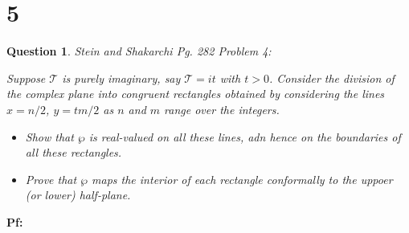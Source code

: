 \documentclass{article}
\newtheorem{question}{Question}
\begin{document}
\break

\section*{5}
\begin{myBox}[]{}
    \begin{question}
        Stein and Shakarchi Pg. 282 Problem 4:

        Suppose $\mathcal{T}$ is purely imaginary, say $\mathcal{T}=it$ with $t>0$. 
        Consider the division of the complex plane into congruent rectangles obtained by considering the lines $x=n/2$, $y=tm/2$ as $n$ and $m$ range over the integers.
        \begin{itemize}
            \item[(a)] Show that $\wp$ is real-valued on all these lines, adn hence on the boundaries of all these rectangles.
            \item[(b)] Prove that $\wp$ maps the interior of each rectangle conformally to the uppoer (or lower) half-plane. 
        \end{itemize}
    \end{question}
\end{myBox}

\textbf{Pf:}
\end{document}
